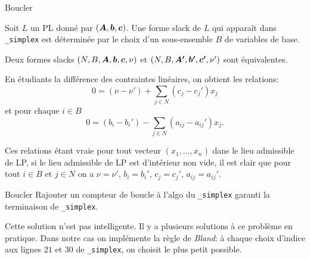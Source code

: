 \documentclass[aspectratio = 169]{beamer}
\begin{document}
\begin{frame}{Boucler}
  \begin{lem}[$\bs{B}$]
    Soit $L$ un PL donné par $(\boldsymbol{A}, \boldsymbol{b}, \boldsymbol{c})$. Une forme
    slack de $L$ qui apparaît dans \texttt{_simplex} est
    déterminée par le choix d'un sous-ensemble $B$ de variables de
    base.
  \end{lem}
  \pause
  \setlength\columnseprule{.1pt}
  \begin{multicols}{2}
    \begin{demo}
      Deux formes slacks $(N, B, \boldsymbol{A}, \boldsymbol{b}, \boldsymbol{c}, \nu)$ et
      $(N, B, \boldsymbol{A'}, \boldsymbol{b'}, \boldsymbol{c'}, \nu')$ sont équivalentes.
      \pause

      \vspace{\baselineskip}
      En étudiants la différence des contraintes linéaires, on obtient
      les relations:
      \[
        0 = (\nu - \nu') + \sum_{j \in N} (c_j - c_j')x_j
      \]
      et pour chaque $i \in B$
      \[
        0 = (b_i - b_i') - \sum_{j \in N} (a_{ij} - a_{ij}')x_j.
      \]

      \pause Ces relations étant vraie pour tout vecteur
      $(x_1, \ldots, x_n)$ dans le lieu admissible de LP, si le lieu
      admissible de LP est d'intérieur non vide, il est clair que pour
      tout $i \in B$ et $j \in N$ on a $\nu = \nu'$, $b_i = b_i'$,
      $c_j = c_j'$, $a_{ij} = a_{ij}'$.
    \end{demo}
  \end{multicols}
\end{frame}

\begin{frame}{Boucler}
  Rajouter un compteur de boucle à l'algo du
  \texttt{_simplex} garanti la terminaison de
  \texttt{_simplex}.
  \pause
  \begin{rem}
    Cette solution n'est pas intelligente. Il y a plusieurs solutions
    à ce problème en pratique. Dans notre cas on implémente la règle
    de \emph{Bland}: à chaque choix d'indice aux lignes $21$ et $30$
    de \texttt{_simplex}, on choisit le plus petit
    possible.
  \end{rem}
\end{frame}
\end{document}
